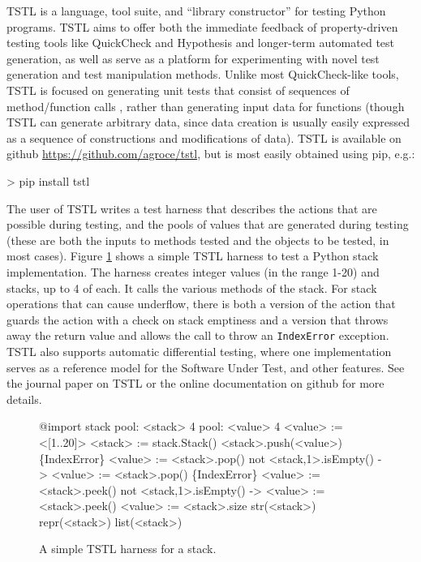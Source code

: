 TSTL \cite{tstlsttt,NFM15,ISSTA15} is a language, tool suite, and
``library constructor'' for testing Python programs.  TSTL aims to
offer both the immediate feedback of property-driven testing tools
like QuickCheck and Hypothesis \cite{ClaessenH00,hypothesis} and
longer-term automated test generation, as well as serve as a platform
for experimenting with novel test generation and test manipulation
methods.   Unlike most QuickCheck-like tools, TSTL is focused on
generating unit tests that consist of sequences of method/function
calls \cite{AndrewsTR}, rather than generating input data for functions (though TSTL
can generate arbitrary data, since data creation is usually easily
expressed as a sequence of constructions and modifications of data).  TSTL is available on github
\url{https://github.com/agroce/tstl}, but is most easily obtained
using pip, e.g.:

{\scriptsize
\begin{code}
> pip install tstl
\end{code}
}

The user of TSTL writes a test harness \cite{WODACommon} that describes
the actions that are possible during testing, and the pools of values
that are generated during testing (these are both the inputs to
methods tested and the objects to be tested, in most cases).  Figure
\ref{fig:stack} shows a simple TSTL harness to test a Python stack
implementation.  The harness creates integer values (in the range
1-20) and stacks, up to 4 of each.  It calls the various methods of
the stack.  For stack operations that can cause underflow, there is
both a version of the action that guards the action with a check on
stack emptiness and a version that throws away the return value and
allows the call to throw an {\tt IndexError} exception.  TSTL also
supports automatic differential \cite{Differential} testing, where one implementation
serves as a reference model for the Software Under Test, and other
features.  See the journal paper on TSTL \cite{tstlsttt} or the online
documentation on github for more details.

\begin{figure}
{\scriptsize
\begin{code}
@import stack
\vspace{0.1in}
pool: <stack> 4
pool: <value> 4
\vspace{0.1in}
<value> := <[1..20]>
\vspace{0.1in}
<stack> := stack.Stack()
\vspace{0.1in}
<stack>.push(<value>)
\{IndexError\} <value> := <stack>.pop() 
not <stack,1>.isEmpty() -> <value> := <stack>.pop()
\{IndexError\} <value> := <stack>.peek() 
not <stack,1>.isEmpty() -> <value> := <stack>.peek()
<value> := <stack>.size
str(<stack>)
repr(<stack>)
list(<stack>)
\end{code}
}
\caption{A simple TSTL harness for a stack.}
\label{fig:stack}
\end{figure}

